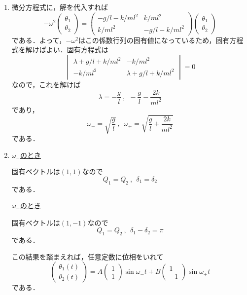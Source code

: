 \documentclass[a4paper,pdflatex,ja=standard]{bxjsarticle}
\begin{document}
\begin{enumerate}
  \item 
  微分方程式に，解を代入すれば
  \begin{equation}
    -\omega^2
    \begin{pmatrix}
      \theta_{1} \\
      \theta_{2}
    \end{pmatrix}
    =
    \begin{pmatrix}
      -g/l-k/ml^2 & k/ml^2 \\
      k/ml^2 & -g/l-k/ml^2
    \end{pmatrix}
    \begin{pmatrix}
      \theta_{1} \\
      \theta_{2}
    \end{pmatrix}
  \end{equation}
  である．よって，$-\omega^2$はこの係数行列の固有値になっているため，固有方程式を解けばよい．固有方程式は
  \begin{equation}
    \begin{vmatrix}
      \lambda+g/l+k/ml^2 & -k/ml^2 \\
      -k/ml^2 & \lambda+g/l+k/ml^2
    \end{vmatrix}
    =
    0
  \end{equation}
  なので，これを解けば
  \begin{equation}
    \lambda
    =
    -\frac{g}{l}
    \ ,\ \ 
    -\frac{g}{l}
    -\frac{2k}{ml^2}
  \end{equation}
  であり，
  \begin{equation}
    \omega_{-}
    =
    \sqrt{\frac{g}{l}}
    \ ,\ \ 
    \omega_{+}
    =
    \sqrt{\frac{g}{l}
    +\frac{2k}{ml^2}}
  \end{equation}
  である．

  \item 
  \uline{$\omega_{-}$のとき}

  固有ベクトルは$(1,1)$なので
  \begin{equation}
    Q_{1}=Q_{2}
    \ ,\ \ 
    \delta_{1}=\delta_{2}
  \end{equation}
  である．

  \uline{$\omega_{+}$のとき}

  固有ベクトルは$(1,-1)$なので
  \begin{equation}
    Q_{1}=Q_{2}
    \ ,\ \ 
    \delta_{1} -\delta_{2} = \pi
  \end{equation}
  である．
  
  この結果を踏まえれば，任意定数に位相をいれて
  \begin{equation}
    \begin{pmatrix}
      \theta_{1}(t) \\
      \theta_{2}(t)
    \end{pmatrix}
    =
    A
    \begin{pmatrix}
      1 \\
      1  
    \end{pmatrix}
    \sin \omega_{-}t
    +
    B
    \begin{pmatrix}
      1 \\
      -1
    \end{pmatrix}
    \sin \omega_{+}t
  \end{equation}
  である．


\end{enumerate}
\end{document}
